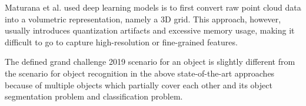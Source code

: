 Maturana et al. \cite{DBLP:conf/iros/MaturanaS15} used deep learning models is to first convert raw point cloud data into a volumetric representation, namely a 3D grid. This approach, however, usually introduces quantization artifacts and excessive memory usage, making it difficult to go to capture high-resolution or fine-grained features.


The defined grand challenge 2019 \cite{DEBSGC2019} scenario for an object is slightly different from the scenario for object recognition in the above state-of-the-art approaches because of multiple objects which partially cover each other and its object segmentation problem and classification problem.       







